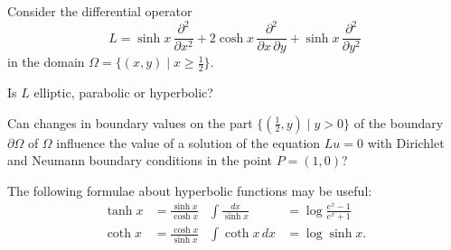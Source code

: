 Consider the differential operator 
\begin{equation}
L
=
\sinh x\,\frac{\partial^2}{\partial x^2}
+
2\cosh x\,\frac{\partial^2}{\partial x\,\partial y}
+
\sinh x\,\frac{\partial^2}{\partial y^2}
\label{90000024:eqn}
\end{equation}
in the domain $\Omega=\{(x,y)\mid x\ge \frac12\}$.
\begin{teilaufgaben}
\item
Is $L$ elliptic, parabolic or hyperbolic?
\item
Can changes in boundary values on the part $\{(\frac12,y)\mid y>0\}$ 
of the boundary $\partial\Omega$ of $\Omega$ influence the value
of a solution of the equation $Lu=0$ with Dirichlet and Neumann
boundary conditions in the point $P=(1,0)$?
\end{teilaufgaben}

\begin{hinweis}
The following formulae about hyperbolic functions may be useful:
\begin{align*}
\tanh x &= \frac{\sinh x}{\cosh x}
&
\int\frac{dx}{\sinh x} &=
\log\frac{e^x-1}{e^x+1}
\\
\coth x &= \frac{\cosh x}{\sinh x}
&\int\coth x\,dx &= \log \sinh x.
\end{align*}
\end{hinweis}



